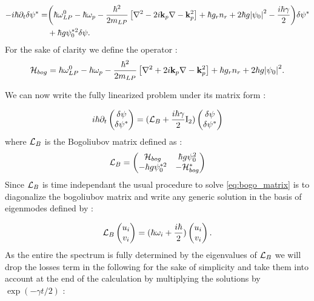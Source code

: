 \begin{equation}
    \begin{split}
    -i  \hbar \partial_t \delta\psi^* = &\biggl(\hbar\omega_{LP}^0 - \hbar \omega_p-\dfrac{\hbar^2}{2m_{LP}}\left[\nabla^2 -2i\mathbf{k}_p\nabla-\mathbf{k}_p^2\right]+\hbar g_rn_r + 2\hbar g \abs{\psi_0}^2- \dfrac{i\hbar\gamma}{2}\biggr) \delta\psi^* \\
      &+ \hbar g \psi_0^{*2} \delta\psi.
    \end{split}
    \label{eq:bogo_v2}
\end{equation}
For the sake of clarity we define the operator :
\begin{equation}
    \mathcal{H}_{bog}= \hbar\omega_{LP}^0 - \hbar \omega_p-\dfrac{\hbar^2}{2m_{LP}}\left[\nabla^2 +2i\mathbf{k}_p\nabla-\mathbf{k}_p^2\right]+\hbar g_rn_r + 2\hbar g \abs{\psi_0}^2.
    \label{eq:hambog}
\end{equation}

We can now write the fully linearized problem under its matrix form :

\begin{equation}
    \begin{matrix}i\hbar \partial_t
        \begin{pmatrix}
             \delta\psi \\
             \delta\psi^*
        \end{pmatrix}
        = (\mathcal{L}_B  +\dfrac{i\hbar\gamma}{2}\mathrm{I_2})
        \begin{pmatrix}
             \delta\psi \\
             \delta\psi^*
        \end{pmatrix}
    \end{matrix}
    \label{eq:bogo_matrix}
\end{equation}
where $\mathcal{L}_B$ is the Bogoliubov matrix defined as :
\begin{equation}
    \begin{matrix}
    \mathcal{L}_B =
    \begin{pmatrix}
        \mathcal{H}_{bog} &  \hbar g \psi_0^2\\
        -\hbar g \psi_0^{*2} & -\mathcal{H}_{bog}^*
    \end{pmatrix}
\end{matrix}
\end{equation} 
Since $\mathcal{L}_B$ is time independant the usual procedure to solve \autoref{eq:bogo_matrix} is to diagonalize the bogoliubov matrix and write any generic solution 
in the basis of eigenmodes defined by :

\begin{equation}
    \mathcal{L}_B \begin{pmatrix}
        u_{i} \\
        v_{i}
    \end{pmatrix} = (\hbar\omega_i+\dfrac{i\hbar}{2}) \begin{pmatrix}
        u_{i} \\
        v_{i}
    \end{pmatrix}.
\end{equation}
As the entire the spectrum is fully determined by the eigenvalues of $\mathcal{L}_B$ we will drop the losses term in the following for the sake of simplicity and 
take them into account at the end of the calculation by multiplying the solutions by $\exp(-\gamma t/2)$ :


